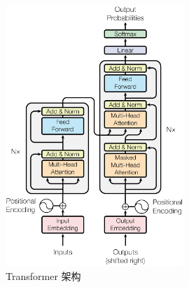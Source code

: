 \begin{figure}[htbp]
    \includegraphics[width=0.6\textwidth]{./figures/transformer.pdf}
    \centering
    \caption{Transformer 架构\cite{vaswani2017attention}}
\end{figure}

